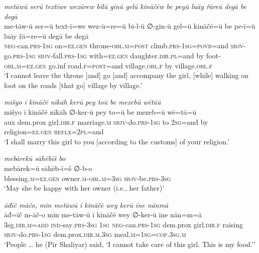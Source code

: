 \ea \label{ŽP.161}
\textit{metāwū serū textīwe wezūrew bilū ginū gelū kināčēw be peyū luāy řāreū degā be degā} \\ 
\gll me-tāw-ū ser=ū text-ī=we wez-ū=re=ū bi-l-ū ∅-gin-ū gel=ū kināčē=ū be pe-ī=ū luāy řā=re=ū degā be degā \\ 
 \textsc{neg-}can\textsc{.prs}\textsc{-\textsc{1sg}} on\textsc{\textsc{=ez.gen}} throne\textsc{-obl}\textsc{.m}\textsc{=\textsc{post}} climb\textsc{.prs}\textsc{-\textsc{1sg}}\textsc{=\textsc{povb}}=and \textsc{sbjv-}go\textsc{.prs}\textsc{-\textsc{1sg}} \textsc{sbjv-}fall\textsc{.prs}\textsc{-\textsc{1sg}} with\textsc{\textsc{=ez.gen}} daughter\textsc{.dir}\textsc{.pl}=and by foot\textsc{-obl}\textsc{.m}\textsc{\textsc{=ez.gen}} go.inf road\textsc{.f}\textsc{=\textsc{post}}=and village\textsc{.obl}\textsc{.f} by village\textsc{.obl}\textsc{.f} \\ 
\glt `I cannot leave the throne [and] go [and] accompany the girl, [while] walking on foot on the roads [that go] village by village.'
\z 
 
\ea \label{ŽP.207}
\textit{mišyo ī kināčē nīkāh kerū pey toū be mezebū wētāū} \\ 
\gll mišyo ī kināčē nīkāh ∅-ker-ū pey to=ū be mezeb=ū wē=tā=ū \\ 
 aux dem.prox girl\textsc{.dir}\textsc{.f} marriage\textsc{.m} \textsc{sbjv-}do\textsc{.prs}\textsc{-\textsc{1sg}} to \textsc{2sg}=and by religion\textsc{\textsc{=ez.gen}} \textsc{reflx}=\textsc{2pl}=and \\ 
\glt `I shall marry this girl to you [according to the customs] of your religion.'
\z 
 
\ea \label{ŽP.211}
\textit{mebārekū sāhēbīš bo} \\ 
\gll mebārek=ū sāhēb-ī=š ∅-b-o \\ 
 blessing\textsc{.m}\textsc{\textsc{=ez.gen}} owner\textsc{.m}\textsc{-obl}\textsc{.m}\textsc{=3sg} \textsc{sbjv-}be\textsc{.prs}\textsc{-3sg} \\ 
\glt `May she be happy with her owner (i.e., her father)'
\z 
 
\ea \label{ŽP.226}
\textit{āđīč māčo, min metāwū ī kināčē wey kerū īne nānmā} \\ 
\gll āđ=īč m-āč-o min me-tāw-ū ī kināčē wey ∅-ker-ū īne nān=m=ā \\ 
 3sg\textsc{.dir}\textsc{.m}\textsc{=add} \textsc{ind-}say\textsc{.prs}\textsc{-3sg} \textsc{1sg} \textsc{neg-}can\textsc{.prs}\textsc{-\textsc{1sg}} dem.prox girl\textsc{.dir}\textsc{.f} raising \textsc{sbjv-}do\textsc{.prs}\textsc{-\textsc{1sg}} dem.prox\textsc{.dir}\textsc{.m}\textsc{.3sg} meal\textsc{.m}\textsc{=\textsc{1sg}}\textsc{=cop}\textsc{.3sg}\textsc{.m} \\ 
\glt `People … he (Pir Shaliyar) said, ‘I cannot take care of this girl. This is my food.’'
\z 
 
